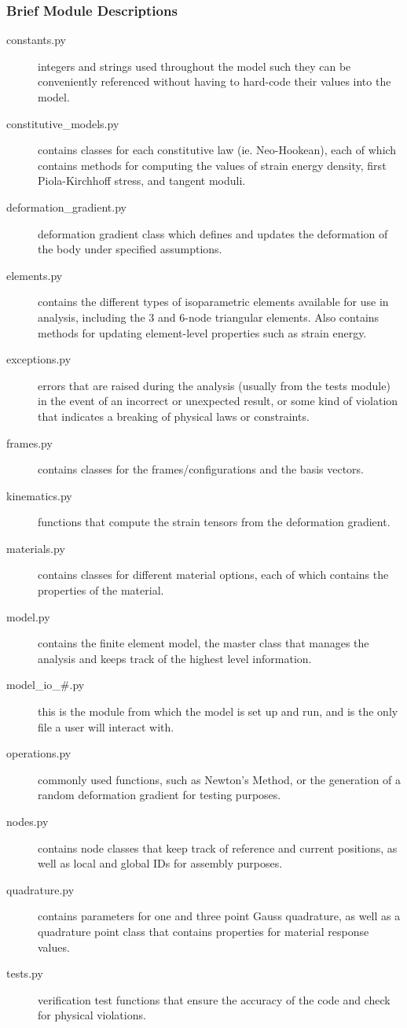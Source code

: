 \documentclass[]{spie}  %
\begin{document}
\subsubsection{Brief Module Descriptions}
\begin{description}
	\item[constants.py] integers and strings used throughout the model such they can be conveniently referenced without having to hard-code their values into the model.
	\item[constitutive\_models.py] contains classes for each constitutive law (ie. Neo-Hookean), each of which contains methods for computing the values of strain energy density, first Piola-Kirchhoff stress, and tangent moduli.
	\item[deformation\_gradient.py] deformation gradient class which defines and updates the deformation of the body under specified assumptions.
	\item[elements.py] contains the different types of isoparametric elements available for use in analysis, including the 3 and 6-node triangular elements. Also contains methods for updating element-level properties such as strain energy. 
	\item[exceptions.py] errors that are raised during the analysis (usually from the tests module) in the event of an incorrect or unexpected result, or some kind of violation that indicates a breaking of physical laws or constraints.
	\item[frames.py] contains classes for the frames/configurations and the basis vectors.
	\item[kinematics.py] functions that compute the strain tensors from the deformation gradient. 
	\item[materials.py] contains classes for different material options, each of which contains the properties of the material.
	\item[model.py] contains the finite element model, the master class that manages the analysis and keeps track of the highest level information. 
	\item[model\_io\_\#.py] this is the module from which the model is set up and run, and is the only file a user will interact with. 
	\item[operations.py] commonly used functions, such as Newton's Method, or the generation of a random deformation gradient for testing purposes. 
	\item[nodes.py] contains node classes that keep track of reference and current positions, as well as local and global IDs for assembly purposes. 
	\item[quadrature.py] contains parameters for one and three point Gauss quadrature, as well as a quadrature point class that contains properties for material response values. 
	\item[tests.py] verification test functions that ensure the accuracy of the code and check for physical violations.
\end{description}
\end{document}
